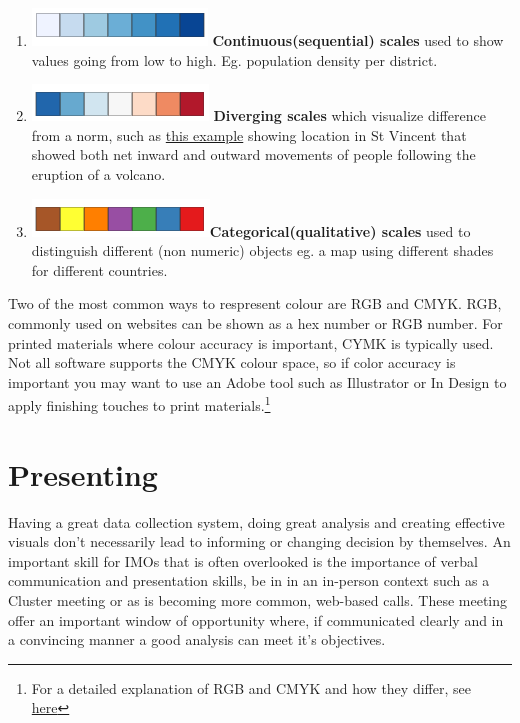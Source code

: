 \documentclass[
  a4paper,
  onecolumn,
  oneside]{book}
\begin{document}
\begin{enumerate}
\def\labelenumi{\arabic{enumi}.}
\item
  \includegraphics{part1/images/sequential-scale.png}
  \textbf{Continuous(sequential) scales} used to show values going from
  low to high. Eg. population density per district.
\item
  \includegraphics{part1/images/diverging-scale.png} \textbf{Diverging
  scales} which visualize difference from a norm, such as
  \href{https://storymaps.arcgis.com/stories/a371cdf9462b4dca9051b9f60a3185bc}{this
  example} showing location in St Vincent that showed both net inward
  and outward movements of people following the eruption of a volcano.
\item
  \includegraphics{part1/images/qualitative-scale.png}\textbf{Categorical(qualitative)
  scales} used to distinguish different (non numeric) objects eg. a map
  using different shades for different countries.
\end{enumerate}

Two of the most common ways to respresent colour are RGB and CMYK. RGB,
commonly used on websites can be shown as a hex number or RGB number.
For printed materials where colour accuracy is important, CYMK is
typically used. Not all software supports the CMYK colour space, so if
color accuracy is important you may want to use an Adobe tool such as
Illustrator or In Design to apply finishing touches to print
materials.\footnote{For a detailed explanation of RGB and CMYK and how
  they differ, see
  \href{https://en.99designs.ch/blog/tips/correct-file-formats-rgb-and-cmyk/}{here}}

\hypertarget{presenting}{%
\section{Presenting}\label{presenting}}

Having a great data collection system, doing great analysis and creating
effective visuals don't necessarily lead to informing or changing
decision by themselves. An important skill for IMOs that is often
overlooked is the importance of verbal communication and presentation
skills, be in in an in-person context such as a Cluster meeting or as is
becoming more common, web-based calls. These meeting offer an important
window of opportunity where, if communicated clearly and in a convincing
manner a good analysis can meet it's objectives.
\end{document}
